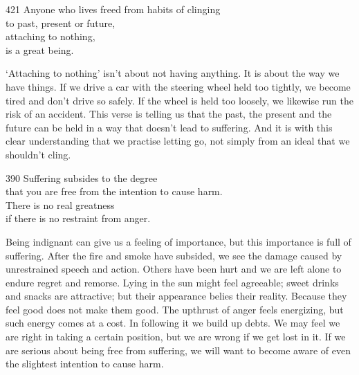 
\begin{dhpVerse}{421}
\label{dhp-421}
Anyone who lives freed from habits of clinging\\
to past, present or future,\\
attaching to nothing,\\
is a great being.
\end{dhpVerse}

\begin{dhpRefl}
`Attaching to nothing' isn't about not having anything. It is about the way we have things. If we drive a car with the steering wheel held too tightly, we become tired and don't drive so safely. If the wheel is held too loosely, we likewise run the risk of an accident. This verse is telling us that the past, the present and the future can be held in a way that doesn't lead to suffering. And it is with this clear understanding that we practise letting go, not simply from an ideal that we shouldn't cling.
\end{dhpRefl}


\begin{dhpVerse}{390}
\label{dhp-390}
Suffering subsides to the degree\\
that you are free from the intention to cause harm.\\
There is no real greatness\\
if there is no restraint from anger.
\end{dhpVerse}

\begin{dhpRefl}
Being indignant can give us a feeling of importance, but this importance is full of suffering. After the fire and smoke have subsided, we see the damage caused by unrestrained speech and action. Others have been hurt and we are left alone to endure regret and remorse. Lying in the sun might feel agreeable; sweet drinks and snacks are attractive; but their appearance belies their reality. Because they feel good does not make them good. The upthrust of anger feels energizing, but such energy comes at a cost. In following it we build up debts. We may feel we are right in taking a certain position, but we are wrong if we get lost in it. If we are serious about being free from suffering, we will want to become aware of even the slightest intention to cause harm.
\end{dhpRefl}


